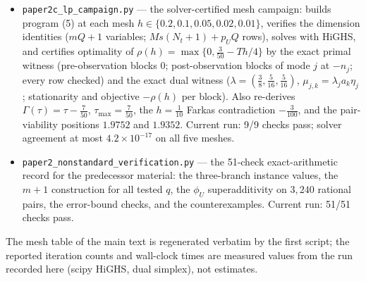 \documentclass[10pt,article]{article}
\providecommand{\tightlist}{\setlength{\itemsep}{0pt}\setlength{\parskip}{0pt}}
\begin{document}
\begin{itemize}\tightlist
\item \texttt{paper2c\_lp\_campaign.py} --- the solver-certified mesh
campaign: builds program (5) at each mesh \(h \in \{0.2, 0.1, 0.05, 0.02,
0.01\}\), verifies the dimension identities (\(mQ{+}1\) variables;
\(Ms(N_t{+}1) + p_U Q\) rows), solves with HiGHS, and certifies optimality of
\(\rho(h) = \max\{0, \tfrac{3}{50} - Th/4\}\) by the exact primal witness
(pre-observation blocks \(0\); post-observation blocks of mode \(j\) at
\(-n_j\); every row checked) and the exact dual witness
(\(\lambda = (\tfrac38, \tfrac5{16}, \tfrac5{16})\),
\(\mu_{j,k} = \lambda_j a_k \eta_j\); stationarity and objective \(-\rho(h)\)
per block). Also re-derives \(\Gamma(\tau) = \tau - \tfrac7{50}\),
\(\tau_{\max} = \tfrac7{50}\), the \(h = \tfrac1{10}\) Farkas contradiction
\(-\tfrac3{100}\), and the pair-viability positions \(1.9752\) and
\(1.9352\). Current run: 9/9 checks pass; solver agreement at most
\(4.2 \times 10^{-17}\) on all five meshes.
\item \texttt{paper2\_nonstandard\_verification.py} --- the 51-check
exact-arithmetic record for the predecessor material: the three-branch
instance values, the \(m+1\) construction for all tested \(q\), the
\(\phi_U\) superadditivity on \(3{,}240\) rational pairs, the error-bound
checks, and the counterexamples. Current run: 51/51 checks pass.
\end{itemize}

The mesh table of the main text is regenerated verbatim by the first script;
the reported iteration counts and wall-clock times are measured values from
the run recorded here (scipy HiGHS, dual simplex), not estimates.
\end{document}
